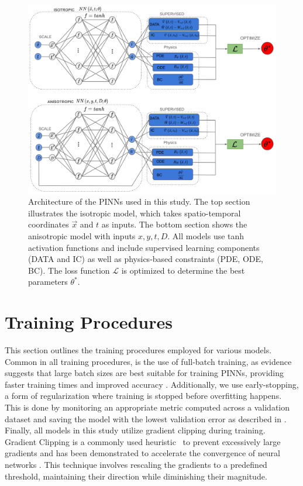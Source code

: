\begin{figure}[H]
  \centering
  \includegraphics[width=\textwidth]{Figs/Architecture.pdf}
  \caption{Architecture of the PINNs used in this study. The top section illustrates the isotropic model, which takes spatio-temporal coordinates \(\vec{x}\) and \(t\) as inputs. The bottom section shows the anisotropic model with inputs \(x, y, t, D\). All models use tanh activation functions and include supervised learning components (DATA and IC) as well as physics-based constraints (PDE, ODE, BC). The loss function \(\mathcal{L}\) is optimized to determine the best parameters \(\theta^*\).}
  \label{fig:architecture}
\end{figure}

\section{Training Procedures}
This section outlines the training procedures employed for various models. Common in all training procedures, is the use of full-batch training, as evidence suggests that large batch sizes are best suitable for training PINNs, providing faster training times and improved accuracy \cite{batch_size}. Additionally, we use early-stopping, a form of regularization where training is stopped before overfitting happens. This is done by monitoring an appropriate metric computed across a validation dataset and saving the model with the lowest validation error as described in \cite{lu2021deepxde}. Finally, all models in this study utilize gradient clipping during training. Gradient Clipping is a commonly used heuristic~\cite{Goodfellow} to prevent excessively large gradients and has been demonstrated to accelerate the convergence of neural networks \cite{gradient_clipping}. This technique involves rescaling the gradients to a predefined threshold, maintaining their direction while diminishing their magnitude.

